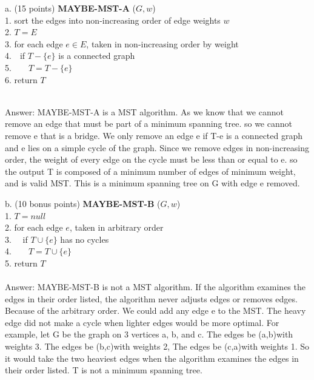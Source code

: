 \documentclass[12pt]{article}
\begin{document}
\begin{enumerate}
a. (15 points) \textbf{MAYBE-MST-A} ($G, w$)\\
1. sort the edges into non-increasing order of edge weights $w$\\
2. $T = E$\\
3. for each edge $e\in E$, taken in non-increasing order by weight\\
4.~~if $T - \{e\}$ is a connected graph\\
5.~~~~$T = T - \{e\}$\\
6. return $T$\\
\\{\color{blue}Answer: MAYBE-MST-A is a MST algorithm. As we know that we cannot remove an edge that must be part of a minimum spanning tree. so we cannot remove e that is a bridge. We only remove an edge e if T-{e} is a connected graph and e lies on a simple cycle of the graph. Since we remove edges in non-increasing order, the weight of every edge on the cycle must be less than or equal to e. so the output T is composed of a minimum number of edges of minimum weight, and is valid MST. This is a minimum spanning tree on G with edge e removed.

}

b. (10 bonus points) \textbf{MAYBE-MST-B} ($G, w$)\\
1. $T = null$\\
2. for each edge $e$, taken in arbitrary order\\
3.~~ if $T \cup \{e\}$ has no cycles\\
4.~~~~$T = T \cup \{e\}$\\
5. return $T$\\

\\{\color{blue} Answer: MAYBE-MST-B is not a MST algorithm. If the algorithm examines the edges in their order listed, the algorithm never adjusts edges or removes edges. Because of the arbitrary order. We could add any edge e to the MST. The heavy edge did not make a cycle when lighter edges would be more optimal. For example, let G be the graph on 3 vertices a, b, and c. The edges be (a,b)with weights 3. The edges be (b,c)with weights 2, The edges be (c,a)with weights 1. So it would take the two heaviest edges when the algorithm examines the edges in their order listed. T is not a minimum spanning tree.
}


\end{enumerate}
\end{document}
